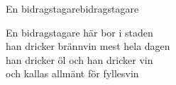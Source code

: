 \begin{song}{En bidragstagare}{bidragstagare}
\begin{vers}
En bidragstagare här bor i staden\\
han dricker brännvin mest hela dagen\\
han dricker öl och han dricker vin\\
och kallas allmänt för fyllesvin\\
\end{vers}
\end{song}

